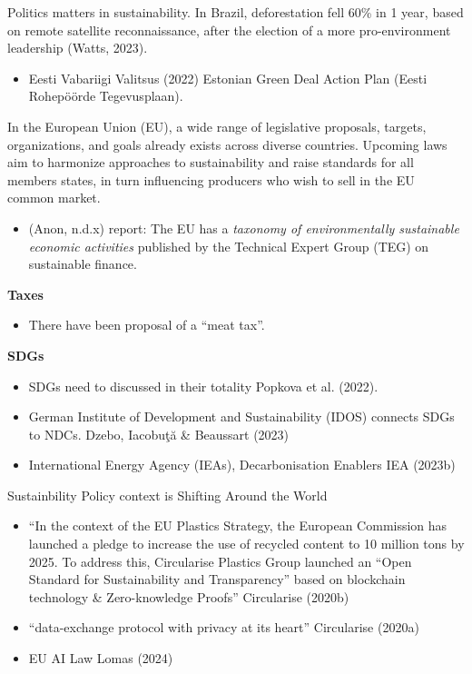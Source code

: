 \documentclass[
  letterpaper,
  DIV=11,
  numbers=noendperiod]{scrartcl}
\providecommand{\tightlist}{%
  \setlength{\itemsep}{0pt}\setlength{\parskip}{0pt}}\usepackage{longtable,booktabs,array}
\begin{document}
Politics matters in sustainability. In Brazil, deforestation fell 60\%
in 1 year, based on remote satellite reconnaissance, after the election
of a more pro-environment leadership (Watts, 2023).

\begin{itemize}
\tightlist
\item
  Eesti Vabariigi Valitsus (2022) Estonian Green Deal Action Plan (Eesti
  Rohepöörde Tegevusplaan).
\end{itemize}

In the European Union (EU), a wide range of legislative proposals,
targets, organizations, and goals already exists across diverse
countries. Upcoming laws aim to harmonize approaches to sustainability
and raise standards for all members states, in turn influencing
producers who wish to sell in the EU common market.

\begin{itemize}
\tightlist
\item
  (Anon, n.d.x) report: The EU has a \emph{taxonomy of environmentally
  sustainable economic activities} published by the Technical Expert
  Group (TEG) on sustainable finance.
\end{itemize}

\textbf{Taxes}

\begin{itemize}
\tightlist
\item
  There have been proposal of a ``meat tax''.
\end{itemize}

\textbf{SDGs}

\begin{itemize}
\item
  SDGs need to discussed in their totality Popkova et al. (2022).
\item
  German Institute of Development and Sustainability (IDOS) connects
  SDGs to NDCs. Dzebo, Iacobuţă \& Beaussart (2023)
\item
  International Energy Agency (IEAs), Decarbonisation Enablers IEA
  (2023b)
\end{itemize}

Sustainbility Policy context is Shifting Around the World

\begin{itemize}
\item
  ``In the context of the EU Plastics Strategy, the European Commission
  has launched a pledge to increase the use of recycled content to 10
  million tons by 2025. To address this, Circularise Plastics Group
  launched an ``Open Standard for Sustainability and Transparency''
  based on blockchain technology \& Zero-knowledge Proofs'' Circularise
  (2020b)
\item
  ``data-exchange protocol with privacy at its heart'' Circularise
  (2020a)
\item
  EU AI Law Lomas (2024)
\end{itemize}
\end{document}
